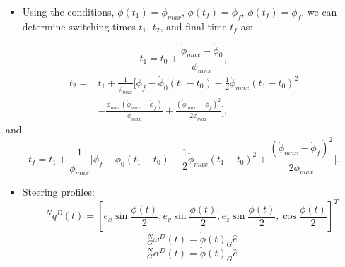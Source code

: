 \documentclass[letterpaper, preprint, paper,11pt]{AAS}	%
\begin{document}
	
	\begin{itemize}
		\item Using the conditions, $\dot{\phi}(t_1)=\dot{\phi}_{max}$, $\dot{\phi}(t_f)=\dot{\phi}_f$, $\phi(t_f)=\phi_f$, we can determine switching times $t_1$, $t_2$, and final time $t_f$ as:
	\end{itemize}
	\begin{equation}\label{t1cons}
	t_1=t_0+\frac{\dot{\phi}_{max}-\dot{\phi}_0}{\ddot{\phi}_{max}},
	\end{equation}
	\begin{equation}\label{t2cons}
	\begin{split}
	t_2=&t_1+\frac{1}{\dot{\phi}_{max}}\Big[ \phi_f-\dot{\phi}_0(t_1-t_0)-\frac{1}{2}\ddot{\phi}_{max}(t_1-t_0)^2\\
	&-\frac{\dot{\phi}_{max}(\dot{\phi}_{max}-\dot{\phi}_f)}{\ddot{\phi}_{max}}+\frac{(\dot{\phi}_{max}-\dot{\phi}_f)^2}{2\ddot{\phi}_{max}} \Big],
	\end{split}
	\end{equation}
	and
	\begin{equation}\label{tfcons}
	t_f=t_1+\frac{1}{\dot{\phi}_{max}}\Big[ \phi_f-\dot{\phi}_0(t_1-t_0)-\frac{1}{2}\ddot{\phi}_{max}(t_1-t_0)^2+\frac{(\dot{\phi}_{max}-\dot{\phi}_f)^2}{2\ddot{\phi}_{max}} \Big].
	\end{equation}
	
	
	\begin{itemize}
		\item Steering profiles:
		\begin{equation}
		^Nq^D(t)=[e_x\sin\frac{\phi(t)}{2}, e_y\sin\frac{\phi(t)}{2}, e_z\sin\frac{\phi(t)}{2}, \cos\frac{\phi(t)}{2}]^T
		\end{equation}
		\begin{equation}
		^N_G\omega^D(t)=\dot{\phi}(t)_G\hat{e}
		\end{equation}
		\begin{equation}
		^N_G\alpha^D(t)=\ddot{\phi}(t)_G\hat{e}
		\end{equation}
	\end{itemize}
	
\end{document}
